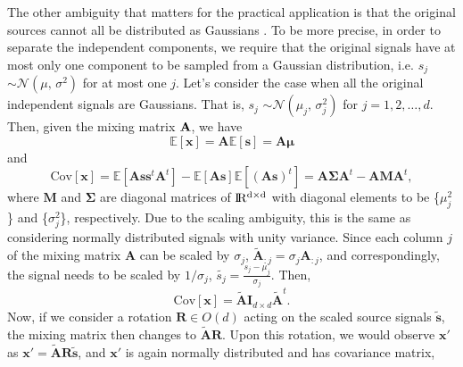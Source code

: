 \documentclass[aps,prl,preprint,superscriptaddress]{revtex4-2}
\begin{document}
The other ambiguity that matters for the practical application is that the original sources cannot all be distributed as Gaussians \cite{lee1998independent, ng_cs229}.
To be more precise, in order to separate the independent components, we require that the original signals have at most only one component to be sampled from a Gaussian distribution, i.e. $s_{j}$ $\sim \mathcal{N}(\mu,\,\sigma^{2})$ for at most one $j$. Let's consider the case when all the original independent signals are Gaussians. That is, $s_{j}$ $\sim \mathcal{N}(\mu_{j},\,\sigma_{j}^{2})$ for $j = 1, 2, \ldots, d$.
Then, given the mixing matrix $\bf{A}$, we have
\begin{equation}
\mathbb{E}[\mathbf{x}] = \mathbf{A}\mathbb{E}[\mathbf{s}] = \mathbf{A}\bm{\mu}
\end{equation}
and
\begin{equation}
\mathrm{Cov}[\mathbf{x}] = \mathbb{E}[\mathbf{As}\mathbf{s}^t\mathbf{A}^{t}]-\mathbb{E}[\mathbf{As}]\mathbb{E}[(\mathbf{As})^{t}] =  \mathbf{A}\bm{\Sigma}\mathbf{A}^{t}-\mathbf{A}\mathbf{M}\mathbf{A}^{t},
\end{equation} where $\mathbf{M}$ and $\bm{\Sigma}$ are diagonal matrices of $\rm I\!R^{d\times d}$ with diagonal elements to be \{$\mu_{j}^{2}$\} and \{$\sigma_{j}^{2}$\}, respectively.
Due to the scaling ambiguity, this is the same as considering normally distributed signals with unity variance. Since each column $j$ of the mixing matrix $\mathbf{A}$ can be scaled by $\sigma_{j}$, $\tilde{\mathbf{A}}_{:j} = \sigma_{j}\mathbf{A}_{:j}$, and correspondingly, the signal needs to be scaled by $1/\sigma_{j}$, $\tilde{s_{j}} = \frac{s_{j}-\mu_{j}}{\sigma_{j}}$. Then,
\begin{equation}
\mathrm{Cov}[\mathbf{x}] = \tilde{\mathbf{A}}\mathbf{I}_{d\times d}\tilde{\mathbf{A}}^{t}.
\end{equation}
Now, if we consider a rotation $\mathbf{R} \in O(d)$ acting on the scaled source signals $\mathbf{\tilde{s}}$, the mixing matrix then changes to $\tilde{\mathbf{A}}\mathbf{R}$.
Upon this rotation, we would observe $\mathbf{x'}$ as $\mathbf{x'} = \tilde{\mathbf{A}}\mathbf{R}\tilde{\mathbf{s}}$, and $\mathbf{x'}$ is again normally distributed and has covariance matrix,
\end{document}
